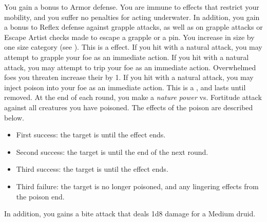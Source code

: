          You gain a  bonus to Armor defense.
         You are immune to effects that restrict your mobility, and you suffer no penalties for acting underwater.
        In addition, you gain a  bonus to Reflex defense against grapple attacks, as well as on grapple attacks or Escape Artist checks made to escape a grapple or a pin.
        You increase in size by one size category (see ).
        This is a  effect.
        If you hit with a natural attack, you may attempt to grapple your foe as an immediate action.
        If you hit with a natural attack, you may attempt to trip your foe as an immediate action.
        Overwhelmed foes you threaten increase their  by 1.
        If you hit with a natural attack, you may inject poison into your foe as an immediate action.
        This is a , and lasts until removed.
        At the end of each round, you make a \textit{nature power} vs. Fortitude attack against all creatures you have poisoned.
        The effects of the poison are described below.
        \begin{itemize}
            \item First success: the target is \sickened until the effect ends.
            \item Second success: the target is \staggered until the end of the next round.
            \item Third success: the target is \nauseated until the effect ends.
            \item Third failure: the target is no longer poisoned, and any lingering effects from the poison end.
        \end{itemize}
        \par In addition, you gains a bite attack that deals 1d8 damage for a Medium druid.

